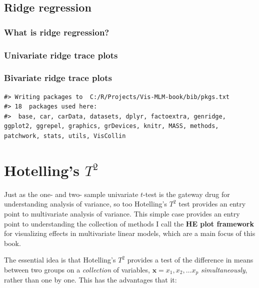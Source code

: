 \documentclass[
  letterpaper,
  10pt,
  krantz2]{krantz}
\begin{document}
\hypertarget{sec:ridge}{%
\section{Ridge regression}\label{sec:ridge}}

\hypertarget{what-is-ridge-regression}{%
\subsection{What is ridge regression?}\label{what-is-ridge-regression}}

\hypertarget{univariate-ridge-trace-plots}{%
\subsection{Univariate ridge trace
plots}\label{univariate-ridge-trace-plots}}

\hypertarget{bivariate-ridge-trace-plots}{%
\subsection{Bivariate ridge trace
plots}\label{bivariate-ridge-trace-plots}}

\begin{verbatim}
#> Writing packages to  C:/R/Projects/Vis-MLM-book/bib/pkgs.txt
#> 18  packages used here:
#>  base, car, carData, datasets, dplyr, factoextra, genridge, ggplot2, ggrepel, graphics, grDevices, knitr, MASS, methods, patchwork, stats, utils, VisCollin
\end{verbatim}


\hypertarget{sec-Hotelling}{%
\chapter{\texorpdfstring{Hotelling's
\(T^2\)}{Hotelling's T\^{}2}}\label{sec-Hotelling}}

Just as the one- and two- sample univariate \(t\)-test is the gateway
drug for understanding analysis of variance, so too Hotelling's \(T^2\)
test provides an entry point to multivariate analysis of variance. This
simple case provides an entry point to understanding the collection of
methods I call the \textbf{HE plot framework} for visualizing effects in
multivariate linear models, which are a main focus of this book.

The essential idea is that Hotelling's \(T^2\) provides a test of the
difference in means between two groups on a \emph{collection} of
variables, \(\mathbf{x} = x_1, x_2, \dots x_p\) \emph{simultaneously},
rather than one by one. This has the advantages that it:
\end{document}
